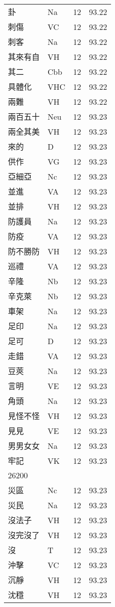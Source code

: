 \documentclass[twocolumn]{book}
\begin{document}
\begin{supertabular}{llrr}
卦 & Na & 12 &  93.22\\
刺傷 & VC & 12 &  93.22\\
刺客 & Na & 12 &  93.22\\
其來有自 & VH & 12 &  93.22\\
其二 & Cbb & 12 &  93.22\\
具體化 & VHC & 12 &  93.22\\
兩難 & VH & 12 &  93.22\\
兩百五十 & Neu & 12 &  93.23\\
兩全其美 & VH & 12 &  93.23\\
來的 & D & 12 &  93.23\\
供作 & VG & 12 &  93.23\\
亞細亞 & Nc & 12 &  93.23\\
並進 & VA & 12 &  93.23\\
並排 & VH & 12 &  93.23\\
防護員 & Na & 12 &  93.23\\
防疫 & VA & 12 &  93.23\\
防不勝防 & VH & 12 &  93.23\\
巡禮 & VA & 12 &  93.23\\
辛隆 & Nb & 12 &  93.23\\
辛克萊 & Nb & 12 &  93.23\\
車架 & Na & 12 &  93.23\\
足印 & Na & 12 &  93.23\\
足可 & D & 12 &  93.23\\
走錯 & VA & 12 &  93.23\\
豆莢 & Na & 12 &  93.23\\
言明 & VE & 12 &  93.23\\
角頭 & Na & 12 &  93.23\\
見怪不怪 & VH & 12 &  93.23\\
見見 & VE & 12 &  93.23\\
男男女女 & Na & 12 &  93.23\\
牢記 & VK & 12 &  93.23\\
26200\\
災區 & Nc & 12 &  93.23\\
災民 & Na & 12 &  93.23\\
沒法子 & VH & 12 &  93.23\\
沒完沒了 & VH & 12 &  93.23\\
沒 & T & 12 &  93.23\\
沖擊 & VC & 12 &  93.23\\
沉靜 & VH & 12 &  93.23\\
沈穩 & VH & 12 &  93.23\\

\end{supertabular}
\end{document}
